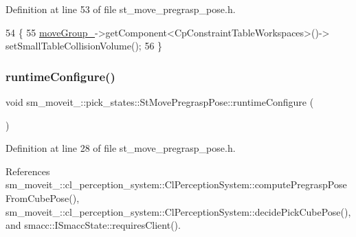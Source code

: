 Definition at line 53 of file st\+\_\+move\+\_\+pregrasp\+\_\+pose.\+h.


\begin{DoxyCode}
54             \{
55                 \hyperlink{structsm__moveit__4_1_1pick__states_1_1StMovePregraspPose_a7ac8229ab37dba1b2eb43668e4adceea}{moveGroup\_}->getComponent<CpConstraintTableWorkspaces>()->
      setSmallTableCollisionVolume();
56             \}
\end{DoxyCode}
\mbox{\label{structsm__moveit__4_1_1pick__states_1_1StMovePregraspPose_ae9ffdf77d89169b5f4fb2cb2fadd56fc}} 
\subsubsection{\texorpdfstring{runtime\+Configure()}{runtimeConfigure()}}
{\footnotesize\ttfamily void sm\+\_\+moveit\+\_\+::pick\+\_\+states\+::\+St\+Move\+Pregrasp\+Pose\+::runtime\+Configure (\begin{DoxyParamCaption}{ }\end{DoxyParamCaption})\hspace{0.3cm}{\ttfamily [inline]}}



Definition at line 28 of file st\+\_\+move\+\_\+pregrasp\+\_\+pose.\+h.



References sm\+\_\+moveit\+\_\+::cl\+\_\+perception\+\_\+system\+::\+Cl\+Perception\+System\+::compute\+Pregrasp\+Pose\+From\+Cube\+Pose(), sm\+\_\+moveit\+\_\+::cl\+\_\+perception\+\_\+system\+::\+Cl\+Perception\+System\+::decide\+Pick\+Cube\+Pose(), and smacc\+::\+I\+Smacc\+State\+::requires\+Client().


